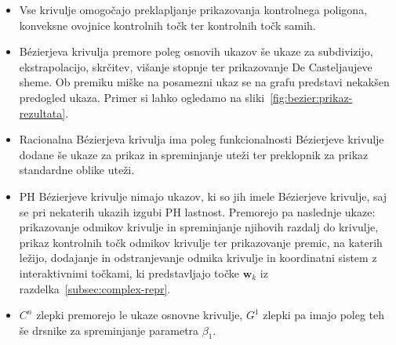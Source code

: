 \documentclass[isrm2, tisk]{fmfdelo}
\begin{document}
    \begin{itemize}
        \item  Vse krivulje omogočajo preklapljanje prikazovanja kontrolnega poligona, konveksne ovojnice kontrolnih točk ter kontrolnih točk samih.
        \item  Bézierjeva krivulja premore poleg osnovih ukazov še ukaze za subdivizijo, ekstrapolacijo, skrčitev, višanje stopnje ter prikazovanje De Casteljaujeve sheme.
        Ob premiku miške na posamezni ukaz se na grafu predstavi nekakšen predogled ukaza.
        Primer si lahko ogledamo na sliki~\ref{fig:bezier:prikaz-rezultata}.
        \item Racionalna Bézierjeva krivulja ima poleg funkcionalnosti Bézierjeve krivulje dodane še ukaze za prikaz in spreminjanje uteži ter preklopnik za prikaz standardne oblike uteži.
        \item PH Bézierjeve krivulje nimajo ukazov, ki so jih imele Bézierjeve krivulje, saj se pri nekaterih ukazih izgubi PH lastnost.
        Premorejo pa naslednje ukaze: prikazovanje odmikov krivulje in spreminjanje njihovih razdalj do krivulje,
        prikaz kontrolnih točk odmikov krivulje ter prikazovanje premic, na katerih ležijo, dodajanje in odstranjevanje odmika krivulje in koordinatni sistem z interaktivnimi točkami, ki predstavljajo točke $\mathbf{w}_k$ iz razdelka~\ref{subsec:complex-repr}.
        \item $C^n$ zlepki premorejo le ukaze osnovne krivulje, $G^1$ zlepki pa imajo poleg teh še drsnike za spreminjanje parametra $\beta_1$.
    \end{itemize}
\end{document}
